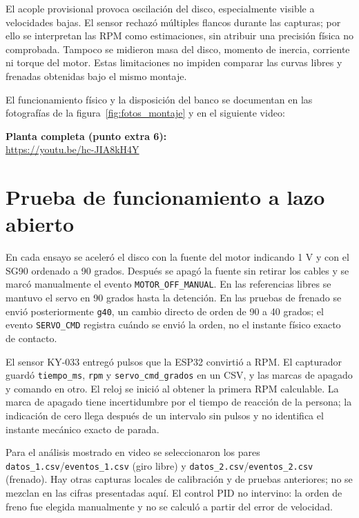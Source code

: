 \documentclass[9pt,a4paper,twocolumn]{extarticle}
\begin{document}
El acople provisional provoca oscilación del disco, especialmente
visible a velocidades bajas. El sensor rechazó múltiples flancos
durante las capturas; por ello se interpretan las RPM como
estimaciones, sin atribuir una precisión física no comprobada.
Tampoco se midieron masa del disco, momento de inercia, corriente
ni torque del motor. Estas limitaciones no impiden comparar las
curvas libres y frenadas obtenidas bajo el mismo montaje.

El funcionamiento físico y la disposición del banco se documentan
en las fotografías de la figura~\ref{fig:fotos_montaje} y en el
siguiente video:

\textbf{Planta completa (punto extra 6):}\\
\url{https://youtu.be/hc-JIA8kH4Y}

\section{Prueba de funcionamiento a lazo abierto}
\label{prueba-de-funcionamiento-a-lazo-abierto}

En cada ensayo se aceleró el disco con la fuente del motor indicando
1 V y con el SG90 ordenado a 90 grados. Después se apagó la fuente
sin retirar los cables y se marcó manualmente el evento
\texttt{MOTOR\_OFF\_MANUAL}. En las referencias libres se mantuvo
el servo en 90 grados hasta la detención. En las pruebas de frenado
se envió posteriormente \texttt{g40}, un cambio directo de orden
de 90 a 40 grados; el evento \texttt{SERVO\_CMD} registra cuándo
se envió la orden, no el instante físico exacto de contacto.

El sensor KY-033 entregó pulsos que la ESP32 convirtió a RPM. El
capturador guardó \texttt{tiempo\_ms}, \texttt{rpm} y
\texttt{servo\_cmd\_grados} en un CSV, y las marcas de apagado y
comando en otro. El reloj se inició al obtener la primera RPM
calculable. La marca de apagado tiene incertidumbre por el tiempo de
reacción de la persona; la indicación de cero llega después de un
intervalo sin pulsos y no identifica el instante mecánico exacto
de parada.

Para el análisis mostrado en video se seleccionaron los pares
\texttt{datos\_1.csv}/\texttt{eventos\_1.csv} (giro libre) y
\texttt{datos\_2.csv}/\texttt{eventos\_2.csv} (frenado). Hay
otras capturas locales de calibración y de pruebas anteriores;
no se mezclan en las cifras presentadas aquí.
El control PID no intervino: la orden de freno fue elegida
manualmente y no se calculó a partir del error de velocidad.
\end{document}

